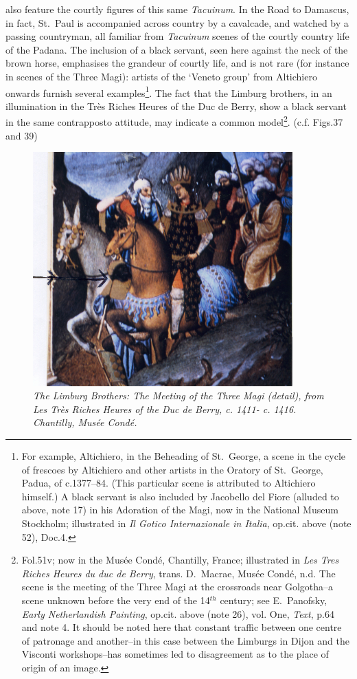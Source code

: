 \documentclass[a4paper,12pt]{article}
\begin{document}
also feature the courtly
figures of this same \textit{Tacuinum}. In the Road to Damascus, in
fact, St.~Paul is accompanied across country by a cavalcade, and
watched by a passing countryman, all familiar from \textit{Tacuinum}
scenes of the courtly country life of the Padana. The inclusion of a
black servant, seen here against the neck of the brown horse,
emphasises the grandeur of courtly life, and is not rare (for instance
in scenes of the Three Magi): artists of the `Veneto group' from
Altichiero onwards furnish several examples\footnote{For example,
Altichiero, in the Beheading of St.~George, a scene in the cycle of
frescoes by Altichiero and other artists in the Oratory of St.~George,
Padua, of c.1377--84. (This particular scene is attributed to
Altichiero himself.) A black servant is also included by Jacobello del
Fiore (alluded to above, note 17) in his Adoration of the Magi, now in
the National Museum Stockholm; illustrated in \textit{Il Gotico
Internazionale in Italia}, op.cit. above (note 52), Doc.4.}. The fact
that the Limburg brothers, in an illumination in the Tr\`es Riches
Heures of the Duc de Berry, show a black servant in the same
contrapposto attitude, may indicate a common model\footnote{Fol.51v;
now in the Mus\'ee Cond\'e, Chantilly, France; illustrated in \textit{Les
Tres Riches Heures du duc de Berry}, trans. D.~Macrae, Mus\'ee Cond\'e,
n.d. The scene is the meeting of the Three Magi at the crossroads near
Golgotha--a scene unknown before the very end of the 14$^{th}$
century; see E.~Panofsky, \textit{Early Netherlandish Painting},
op.cit. above (note 26), vol. One, \textit{Text}, p.64 and note 4. It
should be noted here that constant traffic between one centre of
patronage and another--in this case between the Limburgs in Dijon and
the Visconti workshops--has sometimes led to disagreement as to the
place of origin of an image.}. (c.f. Figs.37 and 39)
\begin{figure}[htbp]
\centering
\includegraphics[width=10cm]{pics/fig39.png}
\caption[The Limburg Brothers: The Meeting of the Three Magi (detail),
  from \textit{Les Tr\`es Riches Heures} of the Duc de Berry, c. 1411-
  c. 1416]  
{\it The Limburg Brothers: The Meeting of the Three Magi (detail),
  from \textit{Les Tr\`es Riches Heures} of the Duc de Berry, c. 1411-
  c. 1416. Chantilly, Mus\'ee Cond\'e.}
\end{figure}
\end{document}
